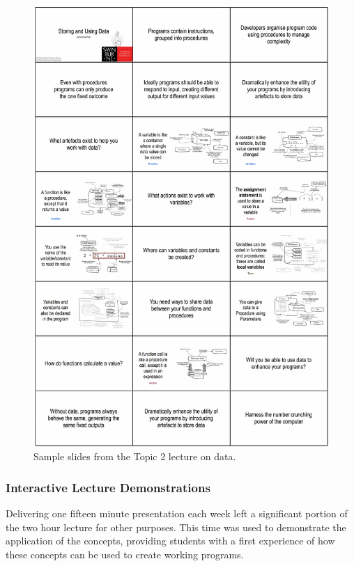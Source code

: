 \begin{figure}[htbp]
	\centering
	\includegraphics[width=\textwidth]{Lecture}
	\caption{Sample slides from the Topic 2 lecture on data.}
	\label{fig:lecture}
\end{figure}


\subsubsection{Interactive Lecture Demonstrations} %
\label{ssub:interactive_lecture_demonstrations}

Delivering one fifteen minute presentation each week left a significant portion of the two hour lecture for other purposes. This time was used to demonstrate the application of the concepts, providing students with a first experience of how these concepts can be used to create working programs.

